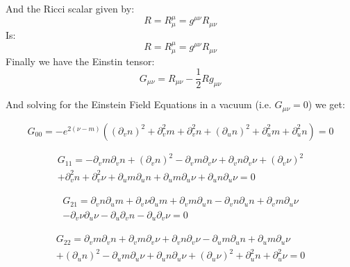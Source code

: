 \documentclass{article}
\begin{document}
And the Ricci scalar given by:
\begin{equation}
R=R_{\mu}^{\mu}=g^{\mu\nu}R_{\mu\nu}
\end{equation}
Is:
\begin{equation}
R=R_{\mu}^{\mu}=g^{\mu\nu}R_{\mu\nu}
\end{equation}
Finally we have the Einstin tensor:
\begin{equation}
G_{\mu\nu}=R_{\mu\nu}-\frac{1}{2}Rg_{\mu\nu}
\end{equation}

And solving for the Einstein Field Equations in a vacuum (i.e. $G_{\mu\nu}=0$)
we get:

\begin{equation}
G_{00}=-e^{2(\nu-m)}\left(\left(\partial_{v}n\right)^{2}+\partial_{v}^{2}m+\partial_{v}^{2}n+\left(\partial_{u}n\right)^{2}+\partial_{u}^{2}m+\partial_{u}^{2}n\right)=0\label{eq:G00}
\end{equation}

\begin{equation}
\begin{split}
G_{11}=-\partial_{v}m\partial_{v}n+\left(\partial_{v}n\right)^{2}-\partial_{v}m\partial_{v}\nu+\partial_{v}n\partial_{v}\nu+\left(\partial_{v}\nu\right)^{2}\\
+\partial_{v}^{2}n+\partial_{v}^{2}\nu+\partial_{u}m\partial_{u}n+\partial_{u}m\partial_{u}\nu+\partial_{u}n\partial_{u}\nu=0
\end{split}
\end{equation}


\begin{equation}
\begin{split}
G_{21}=\partial_{v}n\partial_{u}m+\partial_{v}\nu\partial_{u}m+\partial_{v}m\partial_{u}n-\partial_{v}n\partial_{u}n+\partial_{v}m\partial_{u}\nu\\
-\partial_{v}\nu\partial_{u}\nu-\partial_{u}\partial_{v}n-\partial_{u}\partial_{v}\nu=0
\end{split}
\end{equation}


\begin{equation}
\begin{split}
G_{22}=\partial_{v}m\partial_{v}n+\partial_{v}m\partial_{v}\nu+\partial_{v}n\partial_{v}\nu-\partial_{u}m\partial_{u}n+\partial_{u}m\partial_{u}\nu\\
+\left(\partial_{u}n\right)^{2}-\partial_{u}m\partial_{u}\nu+\partial_{u}n\partial_{u}\nu+\left(\partial_{u}\nu\right)^{2}+\partial_{u}^{2}n+\partial_{u}^{2}\nu=0
\end{split}
\end{equation}
\end{document}
